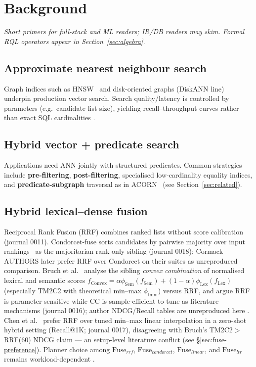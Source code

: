 \section{Background}
\label{sec:background}

\noindent\textit{Short primers for full-stack and ML readers; IR/DB readers may skim.
Formal RQL operators appear in Section~\ref{sec:algebra}.}

\subsection{Approximate nearest neighbour search}
Graph indices such as HNSW~\citep{malkov2018hnsw} and disk-oriented graphs (DiskANN line) underpin production vector search.
Search quality/latency is controlled by parameters (e.g.\ candidate list size), yielding recall--throughput curves rather than exact SQL cardinalities \established{}.

\subsection{Hybrid vector + predicate search}
Applications need ANN jointly with structured predicates.
Common strategies include \textbf{pre-filtering}, \textbf{post-filtering}, specialised low-cardinality equality indices, and \textbf{predicate-subgraph} traversal as in ACORN~\citep{patel2024acorn} \established{} (see Section~\ref{sec:related}).

\subsection{Hybrid lexical--dense fusion}
Reciprocal Rank Fusion (RRF) combines ranked lists without score calibration~\citep{cormack2009rrf} \established{} (journal 0011).
Condorcet-fuse sorts candidates by pairwise majority over input rankings~\citep{montague2002condorcet} \established{} as the majoritarian rank-only sibling (journal 0018); Cormack AUTHORS later prefer RRF over Condorcet on their suites \provisional{} as unreproduced comparison.
Bruch et al.~\citep{bruch2023fusion} analyse the sibling \emph{convex combination} of normalised lexical and semantic scores
\(f_{\mathrm{Convex}}=\alpha\phi_{\mathrm{Sem}}(f_{\mathrm{Sem}})+(1-\alpha)\phi_{\mathrm{Lex}}(f_{\mathrm{Lex}})\)
(especially TM2C2 with theoretical min--max \(\phi_{\mathrm{tmm}}\)) versus RRF, and argue RRF is parameter-sensitive while CC is sample-efficient to tune \established{} as literature mechanisms (journal 0016); author NDCG/Recall tables are unreproduced here \provisional{}.
Chen et al.~\citep{chen2022ood} prefer RRF over tuned min--max linear interpolation in a zero-shot hybrid setting (Recall@1K; journal 0017), disagreeing with Bruch's TM2C2$>$RRF(60) NDCG claim --- an \established{} setup-level literature conflict (see \S\ref{sec:fuse-preference}).
Planner choice among \(\mathrm{Fuse}_{rrf}\), \(\mathrm{Fuse}_{condorcet}\), \(\mathrm{Fuse}_{linear}\), and \(\mathrm{Fuse}_{ltr}\) remains workload-dependent \hypothesis{}.

